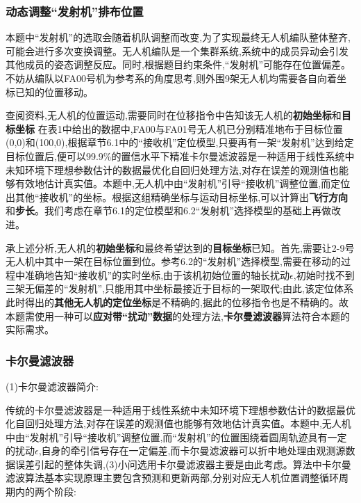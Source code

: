 \documentclass[withoutpreface,bwprint]{cumcmthesis} %
\begin{document}
				\subsubsection{动态调整“发射机”排布位置}
					
					本题中“发射机”的选取会随着机队调整而改变,为了实现最终无人机编队整体整齐,可能会进行多次变换调整。无人机编队是一个集群系统,系统中的成员异动会引发其他成员的姿态调整反应。同时,根据题目约束条件,“发射机”可能存在位置偏差。不妨从编队以FA00号机为参考系的角度思考,则外围9架无人机均需要各自向着坐标已知的位置移动。
						
					查阅资料,无人机的位置运动,需要同时在位移指令中告知该无人机的\textbf{初始坐标}和\textbf{目标坐标}
					在表1中给出的数据中,FA00与FA01号无人机已分别精准地布于目标位置(0,0)和(100,0),根据章节6.1中的“接收机”定位模型,只要再有一架“发射机”达到给定目标位置后,便可以99.9\%的置信水平下精准卡尔曼滤波器是一种适用于线性系统中未知环境下理想参数估计的数据最优化自回归处理方法,对存在误差的观测值也能够有效地估计真实值。本题中,无人机中由“发射机”引导“接收机”调整位置,而定位出其他“接收机”的坐标。根据这组精确坐标与运动目标坐标,可以计算出\textbf{飞行方向}和\textbf{步长}。我们考虑在章节6.1的定位模型和6.2“发射机”选择模型的基础上再做改进。
					
					承上述分析,无人机的\textbf{初始坐标}和最终希望达到的\textbf{目标坐标}已知。首先,需要让2-9号无人机中其中一架在目标位置到位。参考6.2的“发射机”选择模型,需要在移动的过程中准确地告知“接收机”的实时坐标,由于该机初始位置的轴长扰动$\epsilon$,初始时找不到三架无偏差的“发射机”,只能用其中坐标最接近于目标的一架取代;由此,该定位体系此时得出的\textbf{其他无人机的定位坐标}是不精确的,据此的位移指令也是不精确的。故本题需使用一种可以\textbf{应对带“扰动”数据}的处理方法,\textbf{卡尔曼滤波器}算法符合本题的实际需求。
					
					
				\subsubsection{卡尔曼滤波器}
    				
    				(1)卡尔曼滤波器简介:
    					
    					传统的卡尔曼滤波器是一种适用于线性系统中未知环境下理想参数估计的数据最优化自回归处理方法,对存在误差的观测值也能够有效地估计真实值。本题中,无人机中由“发射机”引导“接收机”调整位置,而“发射机”的位置围绕着圆周轨迹具有一定的扰动$\epsilon$,自身的牵引信号存在一定偏差,而卡尔曼滤波器可以折中地处理由观测源数据误差引起的整体失调,(3)小问选用卡尔曼滤波器主要是由此考虑。算法中卡尔曼滤波算法基本实现原理主要包含预测和更新两部,分别对应无人机位置调整循环周期内的两个阶段:
    				
\end{document}
